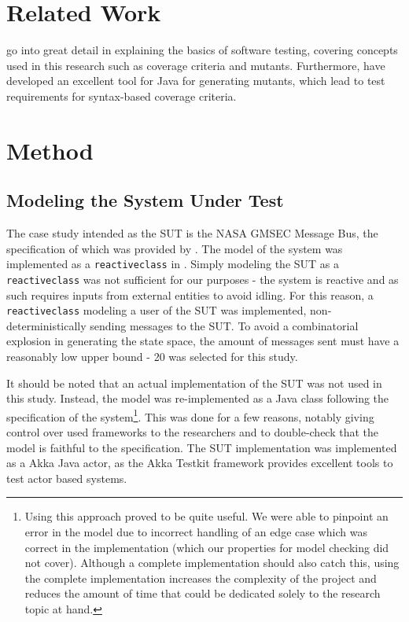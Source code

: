 \documentclass{article}
\begin{document}
	\section{Related Work}
		\citet{ammann2008introduction} go into great detail in explaining the basics of software testing, covering concepts used in this research such as coverage criteria and mutants. Furthermore, \citeauthor{mujava} have developed an excellent tool for Java for generating mutants, which lead to test requirements for syntax-based coverage criteria.
		
	\section{Method}
		\subsection{Modeling the System Under Test}
			The case study intended as the SUT is the NASA GMSEC Message Bus, the specification of which was provided by \citeauthor{fraunhofer}. The model of the system was implemented as a \texttt{reactiveclass} in \Rebeca. Simply modeling the SUT as a \texttt{reactiveclass} was not sufficient for our purposes \-- the system is reactive and as such requires inputs from external entities to avoid idling. For this reason, a \texttt{reactiveclass} modeling a user of the SUT was implemented, non-deterministically sending messages to the SUT. To avoid a combinatorial explosion in generating the state space, the amount of messages sent must have a reasonably low upper bound \-- 20 was selected for this study.

			It should be noted that an actual implementation of the SUT was not used in this study. Instead, the model was re-implemented as a Java class following the specification of the system\footnote{Using this approach proved to be quite useful. We were able to pinpoint an error in the model due to incorrect handling of an edge case which was correct in the implementation (which our properties for model checking did not cover). Although a complete implementation should also catch this, using the complete implementation increases the complexity of the project and reduces the amount of time that could be dedicated solely to the research topic at hand. }. This was done for a few reasons, notably giving control over used frameworks to the researchers and to double-check that the model is faithful to the specification. The SUT implementation was implemented as a Akka Java actor, as the Akka Testkit framework provides excellent tools to test actor based systems.
\end{document}

